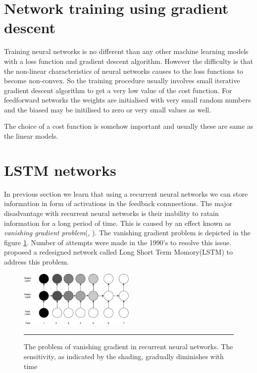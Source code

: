 \section {Network training using gradient descent}
Training neural networks is no different than any other machine learning models with a loss
function and gradient descent algorithm. However the difficulty is that the non-linear
characteristics of neural networks causes to the loss functions to become non-convex. So the
training procedure usually involves small iterative gradient descent algorithm to get a very low
value of the cost function. For feedforward networks the weights are initialised with very small
random numbers and the biased may be initilised to zero or very small values as well.

The choice of a cost function is somehow important and usually these are same as the linear models.

\section{LSTM networks}
In previous section we learn that using a recurrent neural networks we can store information in
form of activations in the feedback connnections. The major disadvantage with recurrent neural
networks is their inability to ratain information for a long period of time. This is caused by an
effect known as \emph{vanishing gradient problem}(\citet{bengio1994learning},
\citet{hochreiter2001gradient}). The vanishing gradient problem is depicted in the figure
\ref{fig:vanishingGradient}. Number of attempts were made in the 1990's to resolve this issue.
\citet{hochreiter1997long} proposed a redesigned network called Long Short Term Momory(LSTM) to
address this problem.

\begin{figure}[htbp]
  \centering
    \includegraphics[width=0.5\textwidth,height=0.5\textheight,keepaspectratio]{Figures/vanishing-gradient.pdf}
    \rule{35em}{0.5pt}
  \caption[Vanishing Gradient] {The problem of vanishing gradient in recurrent neural networks.
  The sensitivity, as indicated by the shading, gradually diminishes with time}
  \label{fig:vanishingGradient}
\end{figure}



